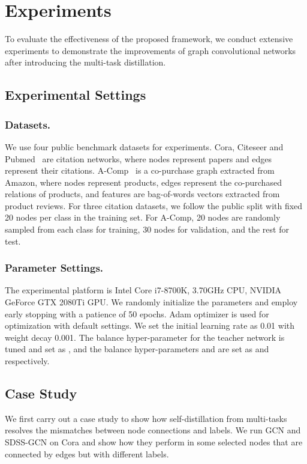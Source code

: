 \documentclass[letterpaper]{article} \usepackage{aaai22} \usepackage{times} \usepackage{helvet} \usepackage{courier} \usepackage[hyphens]{url} \usepackage{graphicx} \urlstyle{rm} \def\UrlFont{\rm} \usepackage{subfigure}
\begin{document}
	
	\section{Experiments}
	
	To evaluate the effectiveness of the proposed framework, we conduct extensive experiments to demonstrate the improvements of graph convolutional networks after introducing the multi-task distillation. 
	\subsection{Experimental Settings}
	\subsubsection{Datasets.} We use four public benchmark datasets for experiments. Cora, Citeseer and Pubmed~\cite{Sen2008cc} are citation networks, where nodes represent papers and edges represent their citations. A-Comp~\cite{Yang2021CPF} is a co-purchase graph extracted from Amazon, where nodes represent products, edges represent the co-purchased relations of products, and features are bag-of-words vectors extracted from product reviews. 
	For three citation datasets, we follow the public split with fixed 20 nodes per class in the training set. For A-Comp, 20 nodes are randomly sampled from each class for training, 30 nodes for validation, and the rest for test.
	
	\subsubsection{Parameter Settings.} The experimental platform is Intel Core i7-8700K, 3.70GHz CPU, NVIDIA GeForce GTX 2080Ti GPU. We randomly initialize the parameters and employ early stopping with a patience of 50 epochs. Adam optimizer is used for optimization with default settings. We set the initial learning rate as 0.01 with weight decay 0.001. The balance hyper-parameter  for the teacher network is tuned and set as , and the balance hyper-parameters  and  are set as  and  respectively. 
	
	\subsection{Case Study}
	
	We first carry out a case study to show how self-distillation from multi-tasks resolves the mismatches between node connections and labels. We run GCN and SDSS-GCN on Cora and show how they perform in some selected nodes that are connected by edges but with different labels. 
	
\end{document}
